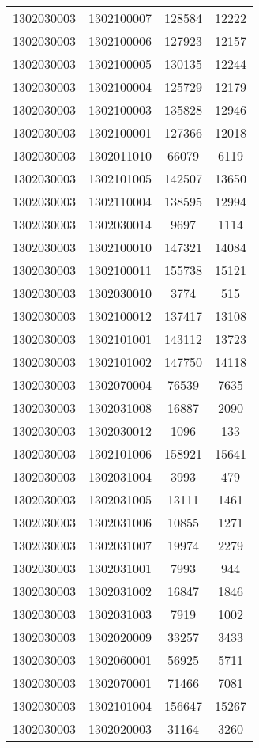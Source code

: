 \begin{longtable}[h]{llcc}
		1302030003 & 1302100007 & 128584 & 12222\\
		1302030003 & 1302100006 & 127923 & 12157\\
		1302030003 & 1302100005 & 130135 & 12244\\
		1302030003 & 1302100004 & 125729 & 12179\\
		1302030003 & 1302100003 & 135828 & 12946\\
		1302030003 & 1302100001 & 127366 & 12018\\
		1302030003 & 1302011010 & 66079 & 6119\\
		1302030003 & 1302101005 & 142507 & 13650\\
		1302030003 & 1302110004 & 138595 & 12994\\
		1302030003 & 1302030014 & 9697 & 1114\\
		1302030003 & 1302100010 & 147321 & 14084\\
		1302030003 & 1302100011 & 155738 & 15121\\
		1302030003 & 1302030010 & 3774 & 515\\
		1302030003 & 1302100012 & 137417 & 13108\\
		1302030003 & 1302101001 & 143112 & 13723\\
		1302030003 & 1302101002 & 147750 & 14118\\
		1302030003 & 1302070004 & 76539 & 7635\\
		1302030003 & 1302031008 & 16887 & 2090\\
		1302030003 & 1302030012 & 1096 & 133\\
		1302030003 & 1302101006 & 158921 & 15641\\
		1302030003 & 1302031004 & 3993 & 479\\
		1302030003 & 1302031005 & 13111 & 1461\\
		1302030003 & 1302031006 & 10855 & 1271\\
		1302030003 & 1302031007 & 19974 & 2279\\
		1302030003 & 1302031001 & 7993 & 944\\
		1302030003 & 1302031002 & 16847 & 1846\\
		1302030003 & 1302031003 & 7919 & 1002\\
		1302030003 & 1302020009 & 33257 & 3433\\
		1302030003 & 1302060001 & 56925 & 5711\\
		1302030003 & 1302070001 & 71466 & 7081\\
		1302030003 & 1302101004 & 156647 & 15267\\
		1302030003 & 1302020003 & 31164 & 3260\\

\end{longtable}
